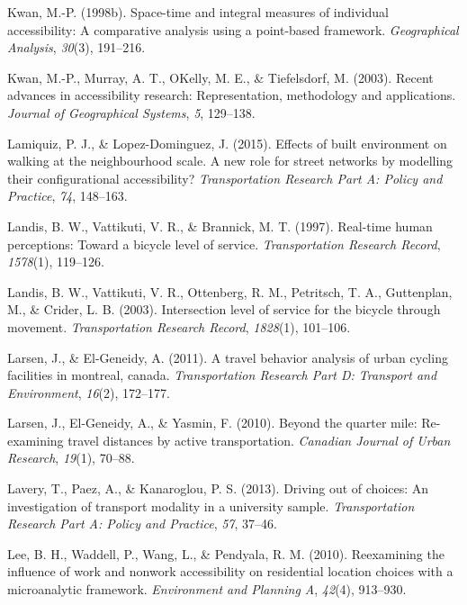 \documentclass[
11pt, %
oneside, %
english, %
singlespacing, %
]{macthesis} %
\newlength{\cslhangindent}
\newenvironment{CSLReferences}[2] %
{\begin{list}{}{%
	\setlength{\itemindent}{0pt}
	\setlength{\leftmargin}{0pt}
	\setlength{\parsep}{0pt}
	\ifodd #1
	\setlength{\leftmargin}{\cslhangindent}
	\setlength{\itemindent}{-1\cslhangindent}
	\fi
	\setlength{\itemsep}{#2\baselineskip}}}
{\end{list}}
\begin{document}
\begin{CSLReferences}{1}{0}
Kwan, M.-P. (1998b). Space-time and integral measures of individual accessibility: A comparative analysis using a point-based framework. \emph{Geographical Analysis}, \emph{30}(3), 191--216.

Kwan, M.-P., Murray, A. T., OKelly, M. E., \& Tiefelsdorf, M. (2003). Recent advances in accessibility research: Representation, methodology and applications. \emph{Journal of Geographical Systems}, \emph{5}, 129--138.

Lamiquiz, P. J., \& Lopez-Dominguez, J. (2015). Effects of built environment on walking at the neighbourhood scale. A new role for street networks by modelling their configurational accessibility? \emph{Transportation Research Part A: Policy and Practice}, \emph{74}, 148--163.

Landis, B. W., Vattikuti, V. R., \& Brannick, M. T. (1997). Real-time human perceptions: Toward a bicycle level of service. \emph{Transportation Research Record}, \emph{1578}(1), 119--126.

Landis, B. W., Vattikuti, V. R., Ottenberg, R. M., Petritsch, T. A., Guttenplan, M., \& Crider, L. B. (2003). Intersection level of service for the bicycle through movement. \emph{Transportation Research Record}, \emph{1828}(1), 101--106.

Larsen, J., \& El-Geneidy, A. (2011). A travel behavior analysis of urban cycling facilities in montreal, canada. \emph{Transportation Research Part D: Transport and Environment}, \emph{16}(2), 172--177.

Larsen, J., El-Geneidy, A., \& Yasmin, F. (2010). Beyond the quarter mile: Re-examining travel distances by active transportation. \emph{Canadian Journal of Urban Research}, \emph{19}(1), 70--88.

Lavery, T., Paez, A., \& Kanaroglou, P. S. (2013). Driving out of choices: An investigation of transport modality in a university sample. \emph{Transportation Research Part A: Policy and Practice}, \emph{57}, 37--46.

Lee, B. H., Waddell, P., Wang, L., \& Pendyala, R. M. (2010). Reexamining the influence of work and nonwork accessibility on residential location choices with a microanalytic framework. \emph{Environment and Planning A}, \emph{42}(4), 913--930.


\end{CSLReferences}
\end{document}
